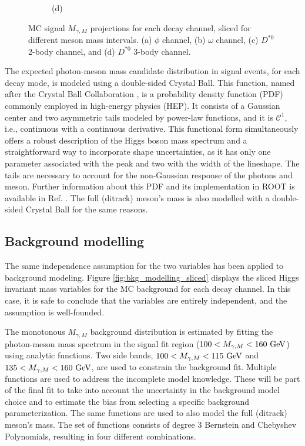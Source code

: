 \begin{figure}[!ht]
\begin{subfigure}[t]{0.50\mylength}
        \caption{\footnotesize (d)}
    \end{subfigure}%
\caption{MC signal $M_{\gamma, M}$ projections for each decay channel, sliced for different meson mass intervals. (a) $\phi$ channel, (b) $\omega$ channel, (c) $D^{*0}$ 2-body channel, and (d) $D^{*0}$ 3-body channel.}
\label{fig:sig_modelling_sliced}
    \vspace*{-0.0cm}
\end{figure}

The expected photon-meson mass candidate distribution in signal events, for each decay mode, is modeled using a double-sided Crystal Ball. This function, named after the Crystal Ball Collaboration \cite{A2:CB}, is a probability density function (PDF) commonly employed in high-energy physics (HEP). It consists of a Gaussian center and two asymmetric tails modeled by power-law functions, and it is $\mathcal{C}^{1}$, i.e., continuous with a continuous derivative. This functional form simultaneously offers a robust description of the Higgs boson mass spectrum and a straightforward way to incorporate shape uncertainties, as it has only one parameter associated with the peak and two with the width of the lineshape. The tails are necessary to account for the non-Gaussian response of the photons and meson. Further information about this PDF and its implementation in ROOT is available in Ref. \cite{CERN:root_CB}. The full (ditrack) meson's mass is also modelled with a double-sided Crystal Ball for the same reasons.

\subsection*{Background modelling}

The same independence assumption for the two variables has been applied to background modeling. Figure \ref{fig:bkg_modelling_sliced} displays the sliced Higgs invariant mass variables for the MC background for each decay channel. In this case, it is safe to conclude that the variables are entirely independent, and the assumption is well-founded.

The monotonous $M_{\gamma, M}$ background distribution is estimated by fitting the photon-meson mass spectrum in the signal fit region ($100 < M_{\gamma, M} < 160\ \text{GeV}$) using analytic functions. Two side bands, $100 < M_{\gamma, M} < 115\ \GeV$ and $135 < M_{\gamma, M} < 160\ \text{GeV}$, are used to constrain the background fit. Multiple functions are used to address the incomplete model knowledge. These will be part of the final fit to take into account the uncertainty in the background model choice and to estimate the bias from selecting a specific background parameterization. The same functions are used to also model the full (ditrack) meson's mass. The set of functions consists of degree 3 Bernstein and Chebyshev Polynomials, resulting in four different combinations.

